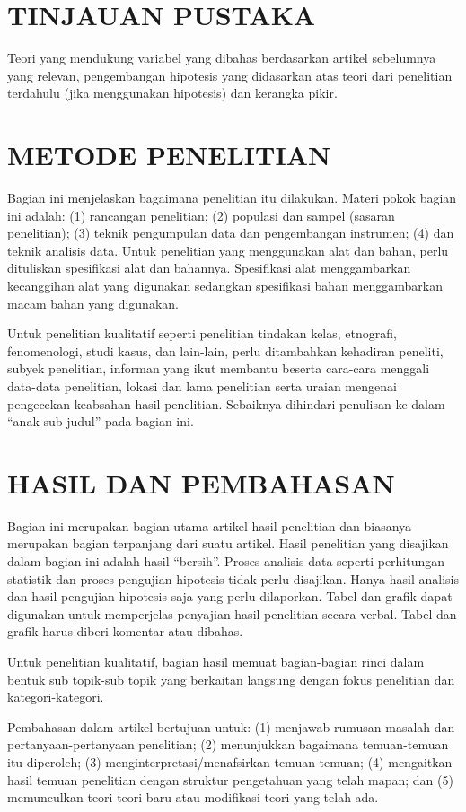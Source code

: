 \section{TINJAUAN PUSTAKA}
Teori yang mendukung variabel yang dibahas berdasarkan artikel sebelumnya
yang relevan, pengembangan hipotesis yang didasarkan atas teori dari penelitian
terdahulu (jika menggunakan hipotesis) dan kerangka pikir.

\section{METODE PENELITIAN}
Bagian ini menjelaskan bagaimana penelitian itu dilakukan. Materi pokok
bagian ini adalah: (1) rancangan penelitian; (2) populasi dan sampel (sasaran
penelitian); (3) teknik pengumpulan data dan pengembangan instrumen; (4) dan teknik
analisis data. Untuk penelitian yang menggunakan alat dan bahan, perlu dituliskan
spesifikasi alat dan bahannya. Spesifikasi alat menggambarkan kecanggihan alat yang
digunakan sedangkan spesifikasi bahan menggambarkan macam bahan yang digunakan.

Untuk penelitian kualitatif seperti penelitian tindakan kelas, etnografi,
fenomenologi, studi kasus, dan lain-lain, perlu ditambahkan kehadiran peneliti, subyek
penelitian, informan yang ikut membantu beserta cara-cara menggali data-data
penelitian, lokasi dan lama penelitian serta uraian mengenai pengecekan keabsahan hasil
penelitian. Sebaiknya dihindari penulisan ke dalam ``anak sub-judul'' pada bagian ini.

\section{HASIL DAN PEMBAHASAN}
Bagian ini merupakan bagian utama artikel hasil penelitian dan biasanya
merupakan bagian terpanjang dari suatu artikel. Hasil penelitian yang disajikan dalam
bagian ini adalah hasil ``bersih''. Proses analisis data seperti perhitungan statistik dan
proses pengujian hipotesis tidak perlu disajikan. Hanya hasil analisis dan hasil
pengujian hipotesis saja yang perlu dilaporkan. Tabel dan grafik dapat digunakan untuk
memperjelas penyajian hasil penelitian secara verbal. Tabel dan grafik harus diberi
komentar atau dibahas.

Untuk penelitian kualitatif, bagian hasil memuat bagian-bagian rinci dalam
bentuk sub topik-sub topik yang berkaitan langsung dengan fokus penelitian dan
kategori-kategori.

Pembahasan dalam artikel bertujuan untuk: (1) menjawab rumusan masalah dan
pertanyaan-pertanyaan penelitian; (2) menunjukkan bagaimana temuan-temuan itu
diperoleh; (3) menginterpretasi/menafsirkan temuan-temuan; (4) mengaitkan hasil
temuan penelitian dengan struktur pengetahuan yang telah mapan; dan (5)
memunculkan teori-teori baru atau modifikasi teori yang telah ada.

